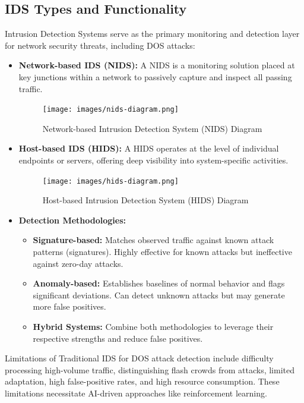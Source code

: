 \documentclass[16pt]{report}
\begin{document}
\subsection{IDS Types and Functionality}
Intrusion Detection Systems serve as the primary monitoring and detection layer for network security threats, including DOS attacks:
\begin{itemize}
    \item \textbf{Network-based IDS (NIDS):} A NIDS is a monitoring solution placed at key junctions within a network to passively capture and inspect all passing traffic.
        \begin{figure}[ht]
            \centering
            \texttt{[image: images/nids-diagram.png]}
            \caption{Network-based Intrusion Detection System (NIDS) Diagram}
            \label{fig:nids-diagram}
        \end{figure}
    \item \textbf{Host-based IDS (HIDS):} A HIDS operates at the level of individual endpoints or servers, offering deep visibility into system-specific activities.
        \begin{figure}[ht]
            \centering
            \texttt{[image: images/hids-diagram.png]}
            \caption{Host-based Intrusion Detection System (HIDS) Diagram}
            \label{fig:hids-diagram}
        \end{figure}
    \item \textbf{Detection Methodologies:}
    \begin{itemize}
        \item \textbf{Signature-based:} Matches observed traffic against known attack patterns (signatures). Highly effective for known attacks but ineffective against zero-day attacks.
        \item \textbf{Anomaly-based:} Establishes baselines of normal behavior and flags significant deviations. Can detect unknown attacks but may generate more false positives.
        \item \textbf{Hybrid Systems:} Combine both methodologies to leverage their respective strengths and reduce false positives.
    \end{itemize}
\end{itemize}

Limitations of Traditional IDS for DOS attack detection include difficulty processing high-volume traffic, distinguishing flash crowds from attacks, limited adaptation, high false-positive rates, and high resource consumption. These limitations necessitate AI-driven approaches like reinforcement learning.
\end{document}
